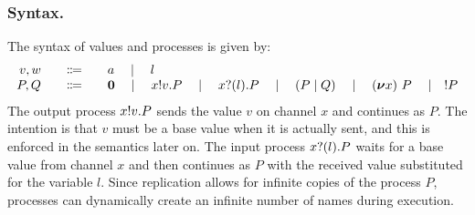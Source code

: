 \documentclass[runningheads]{llncs}
\begin{document}
\subsubsection{Syntax.}
The syntax of values and processes is given by:
\begin{displaymath}
  \begin{array}{r@{\qquad}c@{\qquad}l}
    v,w & \Coloneqq & a \quad\mid\quad l \\
    P,Q & \Coloneqq & \Pend
               \quad \mid\quad \Pout{x}{v}{P}
               \quad \mid\quad \Pin{x}{l}{P}
               \quad \mid\quad \PBpar{P}{Q}
               \quad \mid\quad \Pres{x}{}{P}
               \quad \mid\quad !P
  \end{array}
\end{displaymath}
The output process \( x ! v . P \) sends the value \( v \) on channel \( x \) and continues as \( P \).
The intention is that \( v \) must be a base value when it is actually sent, and this is enforced in the semantics later on.
The input process \( x ? (l) . P \) waits for a base value from channel \( x \) and then continues as \( P \) with the received value substituted for the variable \( l \).
Since replication allows for infinite copies of the process $P$, processes can dynamically
create an infinite number of names during execution.
\end{document}
